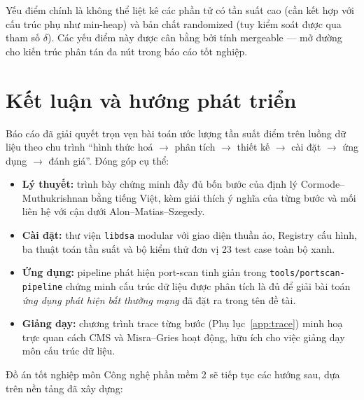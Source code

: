 Yếu điểm chính là không thể liệt kê các phần tử có tần suất cao (cần kết hợp với cấu trúc phụ như min-heap) và bản chất randomized (tuy kiểm soát được qua tham số $\delta$). Các yếu điểm này được cân bằng bởi tính mergeable --- mở đường cho kiến trúc phân tán đa nút trong báo cáo tốt nghiệp.

\section{Kết luận và hướng phát triển}

Báo cáo đã giải quyết trọn vẹn bài toán ước lượng tần suất điểm trên luồng dữ liệu theo chu trình ``hình thức hoá $\rightarrow$ phân tích $\rightarrow$ thiết kế $\rightarrow$ cài đặt $\rightarrow$ ứng dụng $\rightarrow$ đánh giá''. Đóng góp cụ thể:

\begin{itemize}
  \item \textbf{Lý thuyết:} trình bày chứng minh đầy đủ bốn bước của định lý Cormode--Muthukrishnan bằng tiếng Việt, kèm giải thích ý nghĩa của từng bước và mối liên hệ với cận dưới Alon--Matias--Szegedy.
  \item \textbf{Cài đặt:} thư viện \texttt{libdsa} modular với giao diện thuần ảo, Registry cấu hình, ba thuật toán tần suất và bộ kiểm thử đơn vị 23 test case toàn bộ xanh.
  \item \textbf{Ứng dụng:} pipeline phát hiện port-scan tinh giản trong \texttt{tools/portscan-pipeline} chứng minh cấu trúc dữ liệu được phân tích là đủ để giải bài toán \textit{ứng dụng phát hiện bất thường mạng} đã đặt ra trong tên đề tài.
  \item \textbf{Giảng dạy:} chương trình trace từng bước (Phụ lục~\ref{app:trace}) minh hoạ trực quan cách CMS và Misra--Gries hoạt động, hữu ích cho việc giảng dạy môn cấu trúc dữ liệu.
\end{itemize}

Đồ án tốt nghiệp môn Công nghệ phần mềm 2 sẽ tiếp tục các hướng sau, dựa trên nền tảng đã xây dựng:

